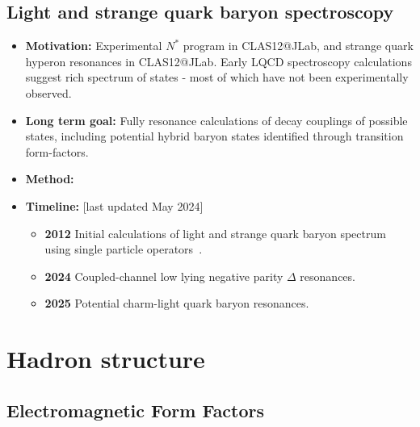 \documentclass[12pt,hyperpdf]{article}
\begin{document}
\subsection{Light and strange quark baryon spectroscopy}
\begin{itemize}
    \item{\bf Motivation:} Experimental $N^\ast$ program in CLAS12@JLab,
      and strange quark hyperon resonances in CLAS12@JLab. Early LQCD
      spectroscopy calculations suggest rich spectrum of states - most
      of which have not been experimentally observed.
    \item{\bf Long term goal:} Fully resonance calculations of decay
      couplings of possible states, including potential hybrid baryon
      states identified through transition form-factors.
    \item{\bf Method:} 
  \item{\bf Timeline:} \hfill [last updated May 2024]
\begin{itemize}
    \item{\bf 2012} Initial calculations of light and strange quark baryon
      spectrum using single particle operators~\cite{Edwards:2011jj,Dudek:2012ag,Edwards:2012fx}.
    \item{\bf 2024} Coupled-channel low lying negative parity $\Delta$ resonances.
    \item{\bf 2025} Potential charm-light quark baryon resonances.
\end{itemize}
\end{itemize}





\section{Hadron structure}\label{sec:hadstruct}

\subsection{Electromagnetic Form Factors}\label{sec:vecff}

\end{document}

